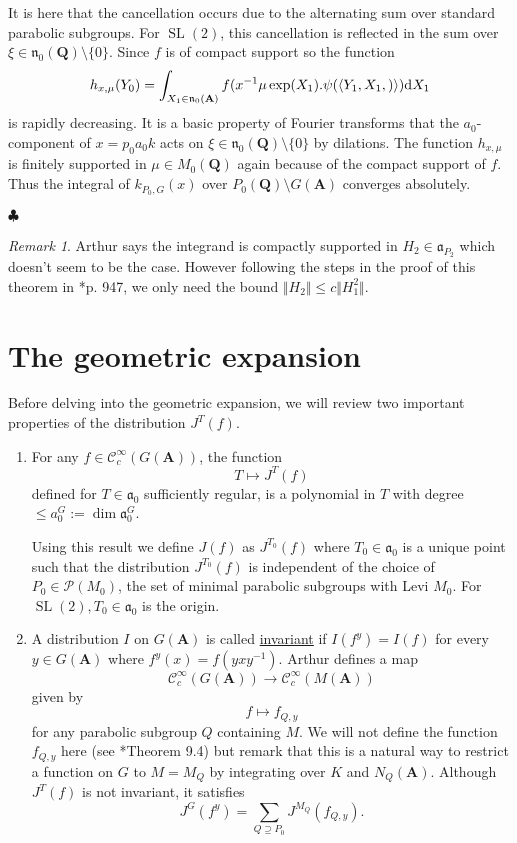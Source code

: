 \documentclass[11pt]{amsart}
\renewcommand\qedsymbol{$\clubsuit$}
\def\A{\mathbf A}
\def\Q{\mathbf Q}
\def\CCC{\mathcal C}
\def\PPP{\mathcal P}
\def\aaa{\mathfrak a}
\def\cb#1{{\color{blue}#1}}
\def\d{\text d}
\def\bs{\setminus} 			%
\def\dim{\operatorname{dim}}
\def\norm#1{\Vert #1 \Vert} %
\def\nnn{\mathfrak n}
\def\sl{\operatorname{SL}}
\def\sprod#1#2{\left\langle #1 , #2 \right\rangle}  %
\theoremstyle{remark}
\newtheorem{remark}[theorem]{Remark}
\begin{document}
\cb{It is here that the cancellation occurs due to the alternating sum over standard parabolic subgroups. For $\sl(2)$, this cancellation is reflected in the sum over $\xi \in \nnn_0(\Q) \bs \{0\}$. Since $f$ is of compact support so the function
\[ h_{x, \mu}(Y_0) = \int_{X_1 \in \nnn_0(\A)} f(x^{-1} \mu \exp(X_1) . \psi(\sprod{Y_1, X_1})) \d X_1 \]
is rapidly decreasing. It is a basic property of Fourier transforms that the $a_0$-component of $x = p_0 a_0 k$ acts on $\xi \in \nnn_0(\Q) \bs \{0\}$ by dilations. The function $h_{x, \mu}$ is finitely supported in $\mu \in M_0(\Q)$ again because of the compact support of $f$. Thus the integral of $k_{P_0, G}(x)$ over $P_0(\Q)\bs G(\A)$ converges absolutely. 
}

\qedsymbol

\begin{remark}
	Arthur says the integrand is compactly supported in $H_2 \in \aaa_{P_2}$ which doesn't seem to be the case. However following the steps in the proof of this theorem in \cite{duke}*{p. 947}, we only need the bound $\norm{H_2} \leq c \norm{H_1^2}$. 
\end{remark}

\section{The geometric expansion} \label{sec:geom}

Before delving into the geometric expansion, we will review two important properties of the distribution $J^T(f)$. 
\begin{enumerate}
	\item For any $f \in \CCC_c^\infty(G(\A))$, the function
		\[ T \mapsto J^T(f) \]
		defined for $T \in \aaa_0$ sufficiently regular, is a polynomial in $T$ with degree $\leq a_0^G := \dim \aaa_0^G$. 
		
		Using this result we define $J(f)$ as $J^{T_0}(f)$ where $T_0 \in \aaa_0$ is a unique point such that the distribution $J^{T_0}(f)$ is independent of the choice of $P_0 \in \PPP(M_0)$, the set of minimal parabolic subgroups with Levi $M_0$. \cb{For $\sl(2), T_0 \in \aaa_0$ is the origin.}
		
	\item A distribution $I$ on $G(\A)$ is called \underline{invariant} if $I(f^y) = I(f)$ for every $y \in G(\A)$ where $f^y(x) = f(yxy^{-1})$. Arthur defines a map
	\[ \CCC_c^\infty(G(\A)) \to \CCC_c^\infty(M(\A)) \]
	given by
	\[ f \mapsto f_{Q, y} \]
	for any parabolic subgroup $Q$ containing $M$. We will not define the function $f_{Q, y}$ here (see \cite{clay}*{Theorem 9.4}) but remark that this is a natural way to restrict a function on $G$ to $M = M_Q$ by integrating over $K$ and $N_Q(\A)$. Although $J^T(f)$ is not invariant, it satisfies
	\[ J^G(f^y) = \sum_{Q \supseteq P_0} J^{M_Q}(f_{Q, y}). \]
\end{enumerate}
\end{document}
